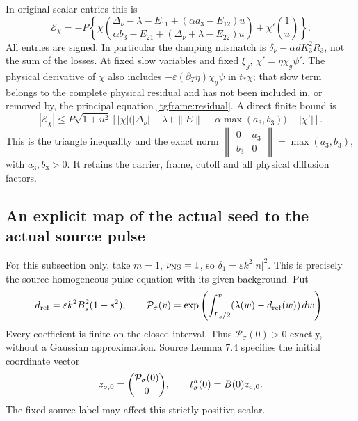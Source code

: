 \documentclass[11pt]{article}
\begin{document}
In original scalar entries this is
\begin{equation}\label{tgframe:residualentries}
 \mathcal E_\chi=-P
 \left\{\chi
 \binom{\Delta_\nu-\lambda-E_{11}+(\alpha a_3-E_{12})u}
       {\alpha b_3-E_{21}+(\Delta_\nu+\lambda-E_{22})u}
       +\chi'\binom1u\right\}.
\end{equation}
All entries are signed. In particular the damping mismatch is
$\delta_\nu-\alpha dK_3^2R_3$, not the sum of the losses.
At fixed slow variables and fixed $\xi_g$, $\chi'=\eta\chi_g\psi'$.
The physical derivative of $\chi$ also includes
$-\varepsilon(\partial_T\eta)\chi_g\psi$ in $t_*\chi$; that slow term
belongs to the complete physical residual and has not been included in,
or removed by, the principal equation \eqref{tgframe:residual}.
A direct finite bound is
\[
 |\mathcal E_\chi|
 \le P\sqrt{1+u^2}\left[
 |\chi|\bigl(|\Delta_\nu|+\lambda+\|E\|
                  +\alpha\max(a_3,b_3)\bigr)+|\chi'|\right].
\]
This is the triangle inequality and the exact norm
$\left\|\begin{smallmatrix}0&a_3\\b_3&0\end{smallmatrix}\right\|
=\max(a_3,b_3)$, with $a_3,b_3>0$.
It retains the carrier, frame, cutoff and all physical diffusion factors.

\subsection{An explicit map of the actual seed to the actual source pulse}

For this subsection only, take $m=1$, $\nu_{\rm NS}=1$, so
$\delta_1=\varepsilon k^2|n|^2$. This is precisely the source
homogeneous pulse equation with its given background. Put
\[
 d_{\rm ref}=\varepsilon k^2B_s^2(1+s^2),\qquad
 {\cal P}_\sigma(v)=
   \exp\left(\int_{L_s/2}^{v}(\lambda(w)-d_{\rm ref}(w))\,dw\right).
\]
Every coefficient is finite on the closed interval. Thus
$\mathcal P_\sigma(0)>0$ exactly, without a Gaussian approximation.
Source Lemma 7.4 specifies the initial coordinate vector
\[
 z_{\sigma,0}=\binom{{\cal P}_\sigma(0)}0,\qquad
 t^h_\sigma(0)=B(0)z_{\sigma,0}.
\]
The fixed source label may affect this strictly positive scalar.
\end{document}
